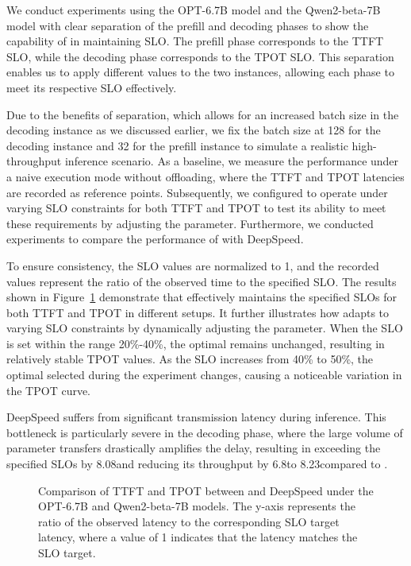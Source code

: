 We conduct experiments using the OPT-6.7B model and the Qwen2-beta-7B model with clear separation of the prefill and decoding phases to show the capability of \sys in maintaining SLO. 
The prefill phase corresponds to the TTFT SLO, while the decoding phase corresponds to the TPOT SLO. 
This separation enables us to apply different \interval values to the two instances, allowing each phase to meet its respective SLO effectively.

Due to the benefits of separation, which allows for an increased batch size in the decoding instance as we discussed earlier, we fix the batch size at 128 for the decoding instance and 32 for the prefill instance to simulate a realistic high-throughput inference scenario. 
As a baseline, we measure the performance under a naive execution mode without offloading, where the TTFT and TPOT latencies are recorded as reference points. 
Subsequently, we configured \sys to operate under varying SLO constraints for both TTFT and TPOT to test its ability to meet these requirements by adjusting the \interval parameter. 
Furthermore, we conducted experiments to compare the performance of \sys with DeepSpeed.

To ensure consistency, the SLO values are normalized to 1, 
and the recorded values represent the ratio of the observed time to the specified SLO. 
The results shown in Figure~\ref{fig:eval1} demonstrate that 
\sys effectively maintains the specified SLOs for both TTFT and TPOT in different setups. 
It further illustrates how \sys adapts to varying SLO constraints by dynamically adjusting the \interval parameter. 
When the SLO is set within the range 20\%-40\%,
the optimal \interval remains unchanged, resulting in relatively stable TPOT values. 
As the SLO increases from 40\% to 50\%, 
the optimal \interval selected during the experiment changes, 
causing a noticeable variation in the TPOT curve.

DeepSpeed suffers from significant transmission latency during inference. 
This bottleneck is particularly severe in the decoding phase, where the large volume of parameter transfers drastically amplifies the delay, 
resulting in exceeding the specified SLOs by 8.08\X and reducing its throughput by 6.8\X to 8.23\X compared to \sys.

\begin{figure}[t]
    \centering
    \resizebox{\columnwidth}{!}{
 }
    \caption{Comparison of TTFT and TPOT between \sys and DeepSpeed under the OPT-6.7B and Qwen2-beta-7B models. 
 The y-axis represents the ratio of the observed latency to the corresponding SLO target latency, where a value of 1 indicates that the latency matches the SLO target.}
    \label{fig:eval1}
\end{figure}


